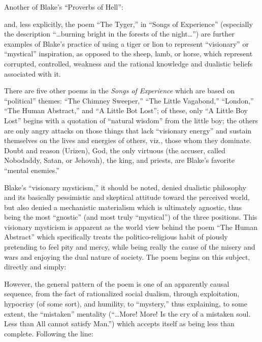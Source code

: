 Another of Blake's \enquote{Proverbs of Hell}:


\noindent and, less explicitly, the poem \enquote{The Tyger,} in \enquote{Songs of Experience} (especially the description \enquote{\dots burning bright
in the forests of the night\dots}) are further examples of Blake's practice of using a tiger or lion to represent \enquote{visionary}
or \enquote{mystical} inspiration, as opposed to the sheep, lamb, or horse, which represent corrupted, controlled, weakness and the rational
knowledge and dualistic beliefs associated with it.

There are five other poems in the \emph{Songs of Experience} which are based on \enquote{political} themes: \enquote{The Chimney Sweeper,}
\enquote{The Little Vagabond,} \enquote{London,} \enquote{The Human Abstract,} and \enquote{A Little Bot Lost}; of these, only \enquote{A Little Boy Lost} begins with a quotation of \enquote{natural wisdom}
from the little boy; the others are only angry attacks on those things that lack \enquote{visionary energy} and sustain themselves on the lives and energies of others, viz.,
those whom they dominate. Doubt and reason (Urizen), God, the only virtuous (the accuser, called Nobodaddy, Satan, or Jehovah), the king, and priests, are Blake's favorite \enquote{mental enemies.}

Blake's \enquote{visionary mysticism,} it should be noted, denied dualistic philosophy and its basically pessimistic and skeptical attitude toward
the perceived world, but also denied a mechanistic materialism which is ultimately agnostic, thus being the most \enquote{gnostic} (and most truly \enquote{mystical}) of
the three positions. This visionary mysticism is apparent as the world view behind the poem \enquote{The Human Abstract} which specifically treats the politico-religious habit of piously
pretending to feel pity and mercy, while being really the cause of the misery and wars and enjoying the dual nature of society. The poem begins on this subject, directly and simply:


However, the general pattern of the poem is one of an apparently causal sequence, from the fact of rationalized social dualism,
through exploitation, hypocrisy (of some sort), and humility, to \enquote{mystery,} thus explaining, to some extent,
the \enquote{mistaken} mentality (\enquote{\dots More! More! Is the cry of a mistaken soul. Less than All cannot satisfy Man.}) which accepts itself as being
less than complete. Following the line:

